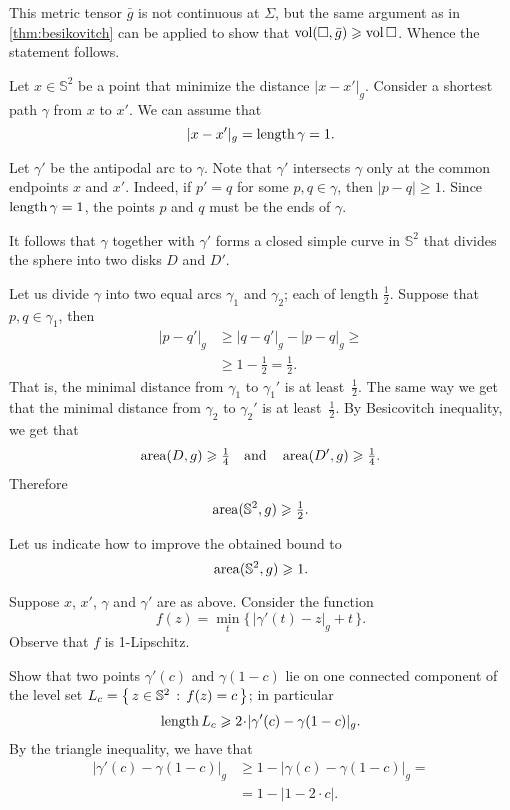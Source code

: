 This metric tensor $\bar g$ is not continuous at $\Sigma$, but the same argument as in \ref{thm:besikovitch} can be applied to show that $\operatorname{\rm vol}\nolimits(\square,\bar g)\geqslant \operatorname{\rm vol}\nolimits\square$.
Whence the statement follows.


Let $x\in \mathbb{S}^2$ be a point that minimize the distance $|x-x'|_g$.
Consider a shortest path $\gamma$ from $x$ to $x'$.
We can assume that 
\[|x-x'|_g=\mathop{\rm length}\nolimits \gamma=1.\]

Let $\gamma'$ be the antipodal arc to $\gamma$.
Note that $\gamma'$ intersects $\gamma$ only at the common endpoints $x$ and $x'$.
Indeed, if $p'=q$ for some $p,q\in\gamma$, then $|p-q|\ge 1$.
Since $\mathop{\rm length}\nolimits \gamma=1$, the points $p$ and $q$ must be the ends of $\gamma$.

It follows that $\gamma$ together with $\gamma'$ forms a closed simple curve in $\mathbb{S}^2$
that divides the sphere into two disks $D$ and $D'$.

Let us divide $\gamma$ into two equal arcs $\gamma_1$ and $\gamma_2$; each of length $\tfrac12$.
Suppose that $p,q\in\gamma_1$, then 
\begin{align*}
|p-q'|_g&\ge |q-q'|_g-|p-q|_g\ge
\\
&\ge 1-\tfrac12=\tfrac12.
\end{align*}
That is, the minimal distance from $\gamma_1$ to $\gamma_1'$ is at least~$\tfrac12$.
The same way we get that the minimal distance from $\gamma_2$ to $\gamma_2'$ is at least~$\tfrac12$.
By Besicovitch inequality, we get that 
\[\operatorname{\rm area}\nolimits(D,g)\geqslant \tfrac14\quad\text{and}\quad \operatorname{\rm area}\nolimits(D',g)\geqslant \tfrac14.\]
Therefore 
\[\operatorname{\rm area}\nolimits(\mathbb{S}^2,g)\geqslant\tfrac12.\]

Let us indicate how to improve the obtained bound to
\[\operatorname{\rm area}\nolimits(\mathbb{S}^2,g)\geqslant1.\]

Suppose $x$, $x'$, $\gamma$ and $\gamma'$ are as above.
Consider the function
\[f(z)=\min_t \{\,|\gamma'(t)-z|_g+t\,\}.\]
Observe that $f$ is 1-Lipschitz.

Show that two points $\gamma'(c)$ and $\gamma(1-c)$ lie on one connected component of the level set $L_c=\left\{\,{z\in\mathbb{S}^2}\,:\,{f(z)=c}\,\right\}$;
in particular 
\[\length L_c\ge 2\cdot|\gamma'(c)-\gamma(1-c)|_g.\]
By the triangle inequality, we have that
\begin{align*}
|\gamma'(c)-\gamma(1-c)|_g&\ge 1-|\gamma(c)-\gamma(1-c)|_g=
\\
&=1-|1-2\cdot c|.
\end{align*}

